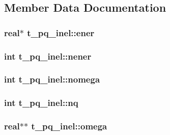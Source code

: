 \subsection{\-Member \-Data \-Documentation}
\hypertarget{structt__pq__inel_ad8e059e4292b78424ad4dd10c62d2a69}{
\subsubsection[{ener}]{\setlength{\rightskip}{0pt plus 5cm}real$\ast$ {\bf t\-\_\-pq\-\_\-inel\-::ener}}}\label{structt__pq__inel_ad8e059e4292b78424ad4dd10c62d2a69}
\hypertarget{structt__pq__inel_a604b5b2b2f927e89ccd5eca907e8e32f}{
\subsubsection[{nener}]{\setlength{\rightskip}{0pt plus 5cm}int {\bf t\-\_\-pq\-\_\-inel\-::nener}}}\label{structt__pq__inel_a604b5b2b2f927e89ccd5eca907e8e32f}
\hypertarget{structt__pq__inel_a876f9930256fa13f377a6b2e4d4dae6f}{
\subsubsection[{nomega}]{\setlength{\rightskip}{0pt plus 5cm}int {\bf t\-\_\-pq\-\_\-inel\-::nomega}}}\label{structt__pq__inel_a876f9930256fa13f377a6b2e4d4dae6f}
\hypertarget{structt__pq__inel_a10e7a3ab7fe3370af7ffab08be532696}{
\subsubsection[{nq}]{\setlength{\rightskip}{0pt plus 5cm}int {\bf t\-\_\-pq\-\_\-inel\-::nq}}}\label{structt__pq__inel_a10e7a3ab7fe3370af7ffab08be532696}
\hypertarget{structt__pq__inel_a9a8b6e9ab72125d659e1201ec06a5724}{
\subsubsection[{omega}]{\setlength{\rightskip}{0pt plus 5cm}real$\ast$$\ast$ {\bf t\-\_\-pq\-\_\-inel\-::omega}}}\label{structt__pq__inel_a9a8b6e9ab72125d659e1201ec06a5724}
